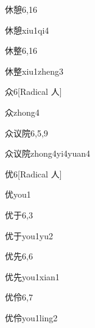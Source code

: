 \begin{entry}{休憩}{6,16}
  \begin{phonetics}{休憩}{xiu1qi4}
  \end{phonetics}
\end{entry}

\begin{entry}{休整}{6,16}
  \begin{phonetics}{休整}{xiu1zheng3}
  \end{phonetics}
\end{entry}

\begin{entry}{众}{6}[Radical 人]
  \begin{phonetics}{众}{zhong4}
  \end{phonetics}
\end{entry}

\begin{entry}{众议院}{6,5,9}
  \begin{phonetics}{众议院}{zhong4yi4yuan4}
  \end{phonetics}
\end{entry}

\begin{entry}{优}{6}[Radical 人]
  \begin{phonetics}{优}{you1}
  \end{phonetics}
\end{entry}

\begin{entry}{优于}{6,3}
  \begin{phonetics}{优于}{you1yu2}
  \end{phonetics}
\end{entry}

\begin{entry}{优先}{6,6}
  \begin{phonetics}{优先}{you1xian1}
  \end{phonetics}
\end{entry}

\begin{entry}{优伶}{6,7}
  \begin{phonetics}{优伶}{you1ling2}
  \end{phonetics}
\end{entry}

